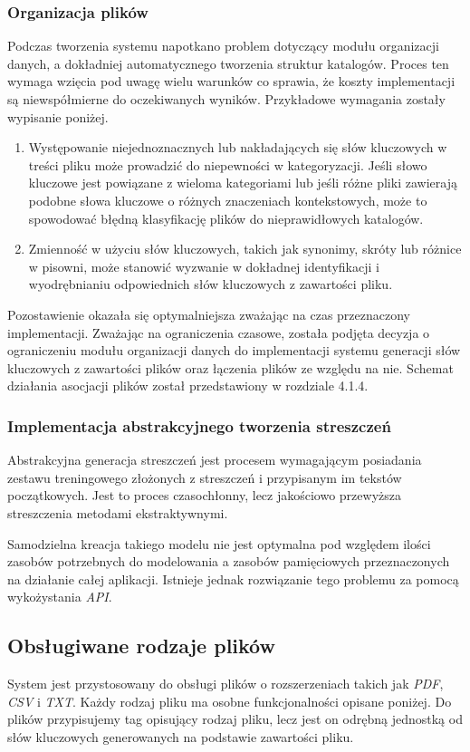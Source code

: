 \documentclass[12pt,a4paper,twoside]{article}
\begin{document}
\subsubsection*{Organizacja plików}
Podczas tworzenia systemu napotkano problem dotyczący modułu organizacji danych, a dokładniej automatycznego tworzenia struktur katalogów. Proces ten wymaga wzięcia pod uwagę wielu warunków co sprawia, że koszty implementacji są niewspółmierne do oczekiwanych wyników. Przykładowe wymagania zostały wypisanie poniżej.
\begin{enumerate}
	\item Występowanie niejednoznacznych lub nakładających się słów kluczowych w treści pliku może prowadzić do niepewności w kategoryzacji. Jeśli słowo kluczowe jest powiązane z wieloma kategoriami lub jeśli różne pliki zawierają podobne słowa kluczowe o różnych znaczeniach kontekstowych, może to spowodować błędną klasyfikację plików do nieprawidłowych katalogów.
	\item Zmienność w użyciu słów kluczowych, takich jak synonimy, skróty lub różnice w pisowni, może stanowić wyzwanie w dokładnej identyfikacji i wyodrębnianiu odpowiednich słów kluczowych z zawartości pliku. 
\end{enumerate}
Pozostawienie okazała się optymalniejsza zważając na czas przeznaczony implementacji.
Zważając na ograniczenia czasowe, została podjęta decyzja o ograniczeniu modułu organizacji danych do implementacji systemu generacji słów kluczowych z zawartości plików oraz łączenia plików ze względu na nie. Schemat działania asocjacji plików został przedstawiony w rozdziale 4.1.4.
\subsubsection*{Implementacja abstrakcyjnego tworzenia streszczeń}
Abstrakcyjna generacja streszczeń jest procesem wymagającym posiadania zestawu treningowego złożonych z streszczeń i przypisanym im tekstów początkowych. Jest to proces czasochłonny, lecz jakościowo przewyższa streszczenia metodami ekstraktywnymi. \par
Samodzielna kreacja takiego modelu nie jest optymalna pod względem ilości zasobów potrzebnych do modelowania a zasobów pamięciowych przeznaczonych na działanie całej aplikacji. Istnieje jednak rozwiązanie tego problemu za pomocą wykożystania \textit{API}. 
\subsection{Obsługiwane rodzaje plików}
System jest przystosowany do obsługi plików o rozszerzeniach takich jak \textit{PDF}, \textit{CSV} i \textit{TXT}. Każdy rodzaj pliku ma osobne funkcjonalności opisane poniżej. Do plików przypisujemy tag opisujący rodzaj pliku, lecz jest on odrębną jednostką od słów kluczowych generowanych na podstawie zawartości pliku.
\end{document}

